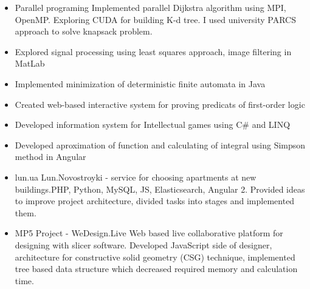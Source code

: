 \documentclass[letterpaper]{twentysecondcv} %
\begin{document}
\begin{itemize}
        {}
    \item \projectItem
        {Parallel programing}
        {Implemented parallel Dijkstra algorithm using MPI, OpenMP. Exploring CUDA for building K-d tree. I used university PARCS approach to solve knapsack problem.}
    \item \projectItem
        {Explored signal processing using least squares approach, image filtering in MatLab}
        {}
    \item \projectItem
        {Implemented minimization of deterministic finite automata in Java}
        {}
    \item \projectItem
        {Created web-based interactive system for proving predicats of first-order logic}
        {}
    \item \projectItem
        {Developed information system for Intellectual games using C\# and LINQ }
        {}
    \item \projectItem
        {Developed aproximation of function and calculating of integral using Simpson method in Angular }
        {}
    \item \projectItem
        {lun.ua}
        {Lun.Novostroyki - service for choosing apartments at new buildings.PHP, Python, MySQL, JS, Elasticsearch, Angular 2. Provided ideas to improve project architecture, divided tasks into stages and implemented them. }
    \item \projectItem
        {MP5 Project - WeDesign.Live}
        {Web based live collaborative platform for designing with slicer software. Developed JavaScript side of designer, architecture for constructive solid geometry (CSG) technique, implemented tree based data structure which decreased required memory and calculation time.}

\end{itemize}
\end{document}
